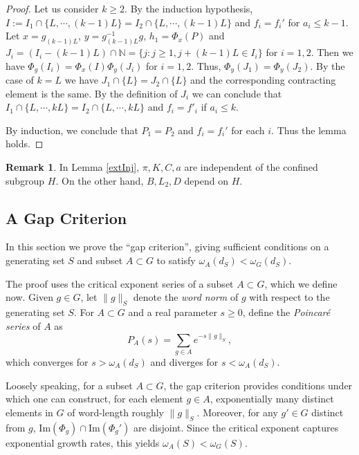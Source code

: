 \documentclass{amsart}
\numberwithin{thm}{section}
\numberwithin{figure}{section}
\theoremstyle{definition}
\newtheorem{remark}[thm]{Remark}
\theoremstyle{definition}
\theoremstyle{remark}
\numberwithin{equation}{section}
\theoremstyle{plain}
\begin{document}
\begin{proof}
	Let us consider $k \ge 2$. By   the induction hypothesis,  $I:= I_1 \cap \{L, \cdots, (k-1)L\} = I_2 \cap \{L, \cdots, (k-1)L\}$ and $f_i = f_i'$ for $a_i\le k-1$. Let $x = g_{(k-1)L}$, $y = g_{(k-1)L}^{-1} g$, $h_1 = \Phi_{x}(P)$ and $J_i = (I_i - (k-1)L)\cap \mathbb{N} = \{j: j\ge 1, j+(k-1)L\in I_i\}$ for $i = 1, 2$. Then we have $\Phi_g(I_i) = \Phi_x(I) \Phi_y(J_i)$ for $i = 1, 2$. Thus, $\Phi_y(J_1) = \Phi_y(J_2)$. By the case of $k=L$ we have $J_1 \cap \{L\} = J_2 \cap \{L\}$ and the corresponding contracting element is the same. By the definition of $J_i$ we can conclude that $I_1\cap \{L, \cdots, kL\} = I_2\cap \{L, \cdots, kL\}$ and $f_i = f'_i$ if $a_i\le k$.
	
	By   induction, we   conclude that $P_1 = P_2$ and $f_i = f_i'$ for each $i$. Thus the lemma holds.
\end{proof}
\begin{remark}
    In Lemma \ref{extInj}, $\pi, K, C, a$ are independent of the confined subgroup $H$. On the other hand, $B, L_2, D$ depend on $H$.
\end{remark}

\subsection{A Gap Criterion}
\label{subsec:gap}
In this section we prove the ``gap criterion'', giving sufficient conditions on a generating set $S$ and subset $A \subset G$ to satisfy $\omega_A(d_{S}) < \omega_G(d_{S})$.

The proof uses the critical exponent series of a subset $A\subset G$, which we define now.
Given $g \in G$, let $\|g\|_S$ denote the \emph{word norm} of $g$ with respect to the generating set $S$. For $A \subset G$ and a real parameter $s \geq 0$, define the \emph{Poincar\'e series} of $A$ as
    \begin{equation}
        P_A(s) = \sum_{g\in A} e^{-s\|g\|_S},
        \label{eq:critical_exp_series}
    \end{equation}
    which converges for $s > \omega_A(d_S)$ and diverges for $s < \omega_A(d_S)$.

Loosely speaking, for a subset $A \subset G$, the gap criterion provides conditions under which one can construct, for each element $g\in A$, exponentially many distinct elements in $G$ of word-length roughly $\| g\|_S$.
Moreover, for any $g' \in G$ distinct from $g$, $\mathrm{Im}(\Phi_g) \cap \mathrm{Im}(\Phi_g')$ are disjoint. Since the critical exponent captures exponential growth rates, this yields $\omega_A(S) < \omega_G(S)$.
\end{document}
